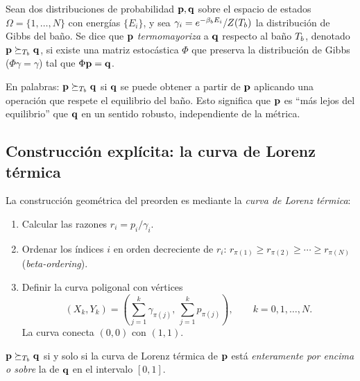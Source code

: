 \begin{definition}[Termomayorización]
\label{def:thermomajorization}
Sean dos distribuciones de probabilidad $\vb{p}, \vb{q}$ sobre el espacio de 
estados $\Omega = \{1, \ldots, N\}$ con energías $\{E_i\}$, y sea 
$\gamma_{i} = e^{-\beta_{b} E_{i}}/Z(T_{b})$ la distribución de Gibbs del baño. Se 
dice que $\vb{p}$ \emph{termomayoriza} a $\vb{q}$ respecto al baño $T_{b}$, 
denotado $\vb{p} \succeq_{T_{b}} \vb{q}$, si existe una matriz estocástica 
$\Phi$ que preserva la distribución de Gibbs ($\Phi \gamma = \gamma$) tal que 
$\Phi \vb{p} = \vb{q}$.
\end{definition}

\noindent En palabras: $\vb{p} \succeq_{T_{b}} \vb{q}$ si $\vb{q}$ se puede 
obtener a partir de $\vb{p}$ aplicando una operación que respete el equilibrio 
del baño. Esto significa que $\vb{p}$ es ``más lejos del equilibrio'' que 
$\vb{q}$ en un sentido robusto, independiente de la métrica.

\subsection{Construcción explícita: la curva de Lorenz térmica}

La construcción geométrica del preorden es mediante la \emph{curva de Lorenz 
térmica}:

\begin{enumerate}
\item Calcular las razones $r_i = p_i / \gamma_i$.
\item Ordenar los índices $i$ en orden decreciente de $r_i$: 
$r_{\pi(1)} \geq r_{\pi(2)} \geq \cdots \geq r_{\pi(N)}$ (\emph{beta-ordering}).
\item Definir la curva poligonal con vértices
\begin{equation}
    (X_k, Y_k) = \left( \sum_{j=1}^{k} \gamma_{\pi(j)}, \, \sum_{j=1}^{k} p_{\pi(j)} \right), 
    \qquad k = 0, 1, \ldots, N.
\end{equation}
La curva conecta $(0,0)$ con $(1,1)$.
\end{enumerate}

\begin{theorem}
\label{thm:lorenz_curve}
$\vb{p} \succeq_{T_{b}} \vb{q}$ si y solo si la curva de Lorenz térmica de $\vb{p}$ 
está \emph{enteramente por encima o sobre} la de $\vb{q}$ en el intervalo 
$[0, 1]$.
\end{theorem}

